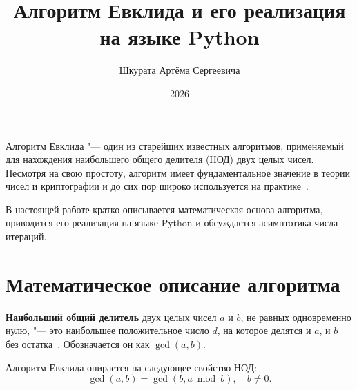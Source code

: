 \documentclass[coursework]{SCWorks}
\begin{document}

\title{Алгоритм Евклида и его реализация на языке Python}




\author{Шкурата Артёма Сергеевича}



\date{2026}

\maketitle

\secNumbering

\tableofcontents

\intro

Алгоритм Евклида "--- один из старейших известных алгоритмов, применяемый для
нахождения наибольшего общего делителя (НОД) двух целых чисел. Несмотря на
свою простоту, алгоритм имеет фундаментальное значение в теории чисел и
криптографии и до сих пор широко используется на практике~\cite{knuth1997art}.

В настоящей работе кратко описывается математическая основа алгоритма,
приводится его реализация на языке Python и обсуждается асимптотика числа
итераций.

\section{Математическое описание алгоритма}

\textbf{Наибольший общий делитель} двух целых чисел $a$ и $b$, не равных
одновременно нулю, "--- это наибольшее положительное число $d$, на которое
делятся и $a$, и $b$ без остатка~\cite{cormen2013algorithms}. Обозначается
он как $\gcd(a, b)$.

Алгоритм Евклида опирается на следующее свойство НОД:
\begin{equation}\label{eq:recurrence}
    \gcd(a, b) = \gcd(b, a \bmod b), \quad b \neq 0.
\end{equation}
\end{document}
